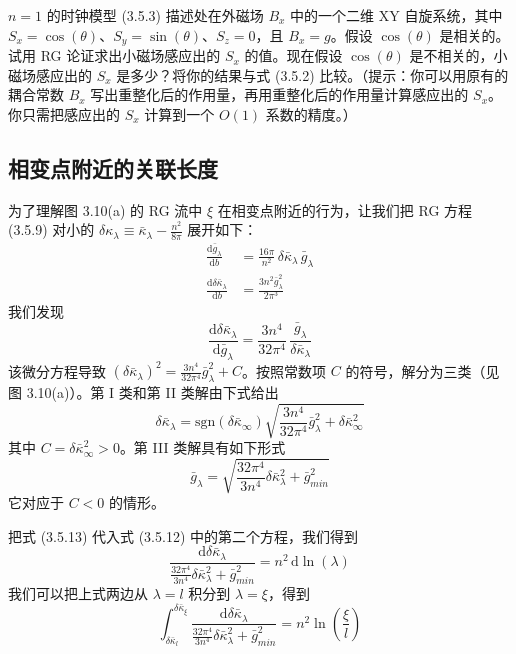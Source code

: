 $n = 1$ 的时钟模型 (3.5.3) 描述处在外磁场 $B_x$ 中的一个二维 XY 自旋系统，其中 $S_x = \cos(\theta)$、$S_y = \sin(\theta)$、$S_z = 0$，且 $B_x = g$。假设 $\cos(\theta)$ 是相关的。试用 RG 论证求出小磁场感应出的 $S_x$ 的值。现在假设 $\cos(\theta)$ 是不相关的，小磁场感应出的 $S_x$ 是多少？将你的结果与式 (3.5.2) 比较。（提示：你可以用原有的耦合常数 $B_x$ 写出重整化后的作用量，再用重整化后的作用量计算感应出的 $S_x$。你只需把感应出的 $S_x$ 计算到一个 $O(1)$ 系数的精度。）

\subsection{相变点附近的关联长度}

为了理解图 3.10(a) 的 RG 流中 $\xi$ 在相变点附近的行为，让我们把 RG 方程 (3.5.9) 对小的 $\delta\kappa_\lambda \equiv \bar{\kappa}_\lambda - \frac{n^2}{8\pi}$ 展开如下：
\begin{align*}
\frac{\mathrm{d}\bar{g}_\lambda}{\mathrm{d}b} &= \frac{16\pi}{n^2}\,\delta\bar{\kappa}_\lambda\,\bar{g}_\lambda \\
\frac{\mathrm{d}\delta\bar{\kappa}_\lambda}{\mathrm{d}b} &= \frac{3n^2\bar{g}_\lambda^2}{2\pi^3}\tag{3.5.12}
\end{align*}
我们发现
\begin{equation*}
\frac{\mathrm{d}\delta\bar{\kappa}_\lambda}{\mathrm{d}\bar{g}_\lambda} = \frac{3n^4}{32\pi^4}\,\frac{\bar{g}_\lambda}{\delta\bar{\kappa}_\lambda}
\end{equation*}
该微分方程导致 $(\delta\bar{\kappa}_\lambda)^2 = \frac{3n^4}{32\pi^4}\bar{g}_\lambda^2 + C$。按照常数项 $C$ 的符号，解分为三类（见图 3.10(a)）。第 I 类和第 II 类解由下式给出
\begin{equation*}
\delta\bar{\kappa}_\lambda = \mathrm{sgn}(\delta\bar{\kappa}_\infty)\sqrt{\frac{3n^4}{32\pi^4}\bar{g}_\lambda^2 + \delta\bar{\kappa}_\infty^2}
\end{equation*}
其中 $C = \delta\bar{\kappa}_\infty^2 > 0$。第 III 类解具有如下形式
\begin{equation*}
\bar{g}_\lambda = \sqrt{\frac{32\pi^4}{3n^4}\delta\bar{\kappa}_\lambda^2 + \bar{g}_{min}^2}\tag{3.5.13}
\end{equation*}
它对应于 $C < 0$ 的情形。

把式 (3.5.13) 代入式 (3.5.12) 中的第二个方程，我们得到
\begin{equation*}
\frac{\mathrm{d}\delta\bar{\kappa}_\lambda}{\frac{32\pi^4}{3n^4}\delta\bar{\kappa}_\lambda^2 + \bar{g}_{min}^2} = n^2\,\mathrm{d}\ln(\lambda)
\end{equation*}
我们可以把上式两边从 $\lambda = l$ 积分到 $\lambda = \xi$，得到
\begin{equation*}
\int_{\delta\bar{\kappa}_l}^{\delta\bar{\kappa}_\xi} \frac{\mathrm{d}\delta\bar{\kappa}_\lambda}{\frac{32\pi^4}{3n^4}\delta\bar{\kappa}_\lambda^2 + \bar{g}_{min}^2} = n^2\ln\!\left(\frac{\xi}{l}\right)\tag{3.5.14}
\end{equation*}

